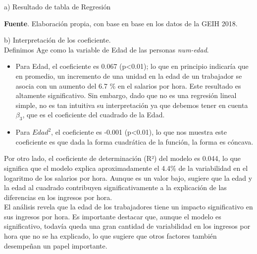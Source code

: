 a) Resultado de tabla de Regresión \\
[5cm]

\begin{table}[H]
\label{tab:Cuadro 3}
\centering
\footnotesize


\begin{center}
    \textbf{Fuente}. Elaboración propia, con base en base en los datos de la GEIH 2018. \\

\end{center}

\end{table}

b) Interpretación de los coeficiente.\\ 

Definimos Age como la variable de Edad de las personas \textit{num-edad}. \\

\begin{itemize}
    \item Para Edad, el coeficiente es 0.067 (p<0.01); lo que en principio indicaría que en promedio, un incremento de una unidad en la edad de un trabajador se asocia con un aumento del 6.7 \% en el salarios por hora. Este resultado es altamente significativo. Sin embargo, dado que no es una regresión lineal simple, no es tan intuitiva su interpretación ya que debemos tener en cuenta $\beta_3$, que es el coeficiente del cuadrado de la Edad. \\
    
    \item Para $Edad^2$, el coeficiente es -0.001 (p<0.01), lo que nos muestra este coeficiente es que dada la forma cuadrática de la función, la forma es cóncava. \\
    
\end{itemize}

Por otro lado, el coeficiente de determinación (R²) del modelo es 0.044, lo que significa que el modelo explica aproximadamente el 4.4\% de la variabilidad en el logaritmo de los salarios por hora. Aunque es un valor bajo, sugiere que la edad y la edad al cuadrado contribuyen significativamente a la explicación de las diferencias en los ingresos por hora. \\
 [5 cm]

El análisis revela que la edad de los trabajadores tiene un impacto significativo en sus ingresos por hora. Es importante destacar que, aunque el modelo es significativo, todavía queda una gran cantidad de variabilidad en los ingresos por hora que no se ha explicado, lo que sugiere que otros factores también desempeñan un papel importante.\\

